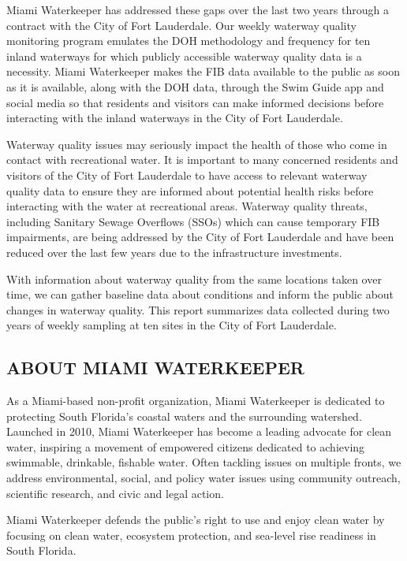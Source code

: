 \documentclass[
]{article}
\begin{document}
Miami Waterkeeper has addressed these gaps over the last two years
through a contract with the City of Fort Lauderdale. Our weekly waterway
quality monitoring program emulates the DOH methodology and frequency
for ten inland waterways for which publicly accessible waterway quality
data is a necessity. Miami Waterkeeper makes the FIB data available to
the public as soon as it is available, along with the DOH data, through
the Swim Guide app and social media so that residents and visitors can
make informed decisions before interacting with the inland waterways in
the City of Fort Lauderdale.

Waterway quality issues may seriously impact the health of those who
come in contact with recreational water. It is important to many
concerned residents and visitors of the City of Fort Lauderdale to have
access to relevant waterway quality data to ensure they are informed
about potential health risks before interacting with the water at
recreational areas. Waterway quality threats, including Sanitary Sewage
Overflows (SSOs) which can cause temporary FIB impairments, are being
addressed by the City of Fort Lauderdale and have been reduced over the
last few years due to the infrastructure investments.

With information about waterway quality from the same locations taken
over time, we can gather baseline data about conditions and inform the
public about changes in waterway quality. This report summarizes data
collected during two years of weekly sampling at ten sites in the City
of Fort Lauderdale.

\hypertarget{about-miami-waterkeeper}{%
\subsection{ABOUT MIAMI WATERKEEPER}\label{about-miami-waterkeeper}}

As a Miami-based non-profit organization, Miami Waterkeeper is dedicated
to protecting South Florida's coastal waters and the surrounding
watershed. Launched in 2010, Miami Waterkeeper has become a leading
advocate for clean water, inspiring a movement of empowered citizens
dedicated to achieving swimmable, drinkable, fishable water. Often
tackling issues on multiple fronts, we address environmental, social,
and policy water issues using community outreach, scientific research,
and civic and legal action.

Miami Waterkeeper defends the public's right to use and enjoy clean
water by focusing on clean water, ecosystem protection, and sea-level
rise readiness in South Florida.
\end{document}
